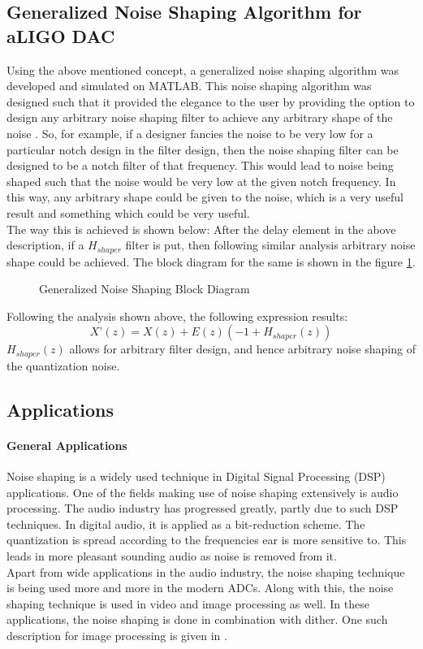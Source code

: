 \documentclass[colorlinks=true,pdfstartview=FitV,linkcolor=blue,
            citecolor=red,urlcolor=magenta]{ligodoc}
\begin{document}
	\subsection{Generalized Noise Shaping Algorithm for aLIGO DAC}
	Using the above mentioned concept, a generalized noise shaping algorithm was developed and simulated on MATLAB. This noise shaping algorithm was designed such that it provided the elegance to the user by providing the option to design any arbitrary noise shaping filter to achieve any arbitrary shape of the noise \cite{Nentwig}. So, for example, if a designer fancies the noise to be very low for a particular notch design in the filter design, then the noise shaping filter can be designed to be a notch filter of that frequency. This would lead to noise being shaped such that the noise would be very low at the given notch frequency. In this way, any arbitrary shape could be given to the noise, which is a very useful result and something which could be very useful. \\The way this is achieved is shown below:
	After the delay element in the above description, if a $H_{shaper}$ filter is put, then following similar analysis arbitrary noise shape could be achieved. The block diagram for the same is shown in the figure \ref{shaper}.
	\begin{figure}[H]

  		\centering
		\def\svgscale{0.5}
  		\tiny{
  		
  		}
  		\caption{Generalized Noise Shaping Block Diagram}
		\label{shaper}
	\end{figure}
	Following the analysis shown above, the following expression results: \\
	\begin{equation}
	X’(z) = X(z) + E(z) (-1 + H_{shaper}(z))
	\end{equation}
	$H_{shaper}(z)$ allows for arbitrary filter design, and hence arbitrary noise shaping of the quantization noise.
    \subsection{Applications}
    		\paragraph{General Applications} Noise shaping is a widely used technique in Digital Signal Processing (DSP) applications. One of the fields making use of noise shaping extensively is audio processing. The audio industry has progressed greatly, partly due to such DSP techniques. In digital audio, it is applied as a bit-reduction scheme. The quantization is spread according to the frequencies ear is more sensitive to. This leads in more pleasant sounding audio as noise is removed from it. \\
    		Apart from wide applications in the audio industry, the noise shaping technique is being used more and more in the modern ADCs. Along with this, the noise shaping technique is used in video and image processing as well. In these applications, the noise shaping is done in combination with dither. One such description for image processing is given in \cite{Christou}. 
\end{document}
